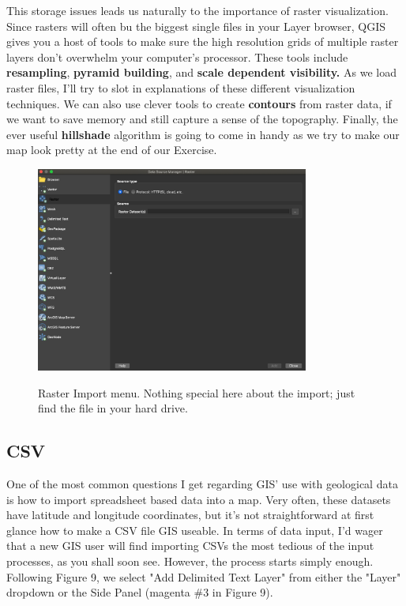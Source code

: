 \documentclass{article}
\begin{document}
This storage issues leads us naturally to the importance of raster visualization. Since rasters will often bu the biggest single files in your Layer browser, QGIS gives you a host of tools to make sure the high resolution grids of multiple raster layers don't overwhelm your computer's processor. These tools include \textbf{resampling}, \textbf{pyramid building}, and \textbf{scale dependent visibility.} As we load raster files, I'll try to slot in explanations of these different visualization techniques. We can also use clever tools to create \textbf{contours} from raster data, if we want to save memory and still capture a sense of the topography. Finally, the ever useful \textbf{hillshade} algorithm is going to come in handy as we try to make our map look pretty at the end of our Exercise. 

\begin{figure}[htbp]
    \centering
    \includegraphics[width=0.8\textwidth]{Fig_12_Raster.png}
    \label{fig12}
    \caption{Raster Import menu. Nothing special here about the import; just find the file in your hard drive.}
\end{figure}

\subsection{CSV}

One of the most common questions I get regarding GIS' use with geological data is how to import spreadsheet based data into a map. Very often, these datasets have latitude and longitude coordinates, but it's not straightforward at first glance how to make a CSV file GIS useable. In terms of data input, I'd wager that a new GIS user will find importing CSVs the most tedious of the input processes, as you shall soon see. However, the process starts simply enough. Following Figure 9, we select "Add Delimited Text Layer" from either the "Layer" dropdown or the Side Panel (magenta \#3 in Figure 9). 
\end{document}
